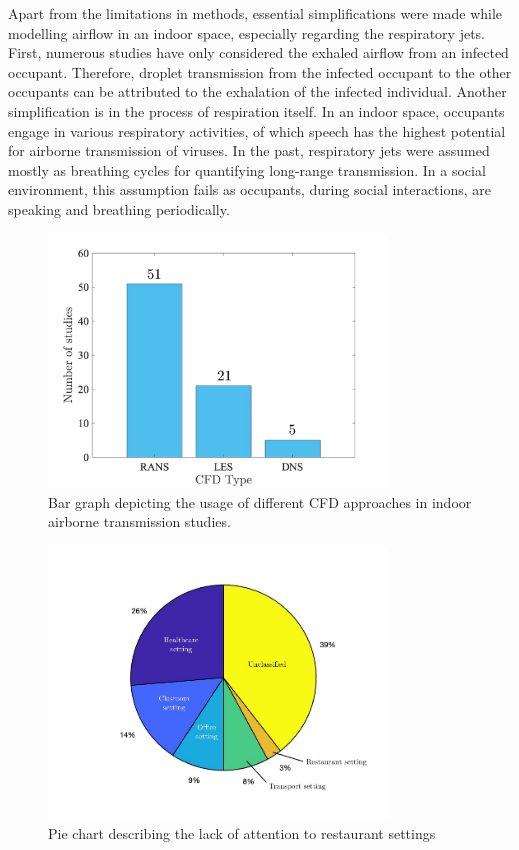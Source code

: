 \documentclass[a4paper,12pt]{elsarticle}
\begin{document}
Apart from the limitations in methods, essential simplifications were made while modelling airflow in an indoor space, especially regarding the respiratory jets. First, numerous studies have only considered the exhaled airflow from an infected occupant. Therefore, droplet transmission from the infected occupant to the other occupants can be attributed to the exhalation of the infected individual. Another simplification is in the process of respiration itself. In an indoor space, occupants engage in various respiratory activities, of which speech has the highest potential for airborne transmission of viruses. In the past, respiratory jets were assumed mostly as breathing cycles for quantifying long-range transmission. In a social environment, this assumption fails as occupants, during social interactions, are speaking and breathing periodically.

\begin{figure}[ht]
    \centering
    \includegraphics[width=0.8\textwidth]{figures/cfd.jpg}
    \caption{Bar graph depicting the usage of different CFD approaches in indoor airborne transmission studies.}
    \label{fig:cfd}
\end{figure}

\begin{figure}[ht]
    \centering
    \includegraphics[width=0.8\textwidth]{figures/pie.jpg}
    \caption{Pie chart describing the lack of attention to restaurant settings}
    \label{fig:pie}
\end{figure}
\end{document}
